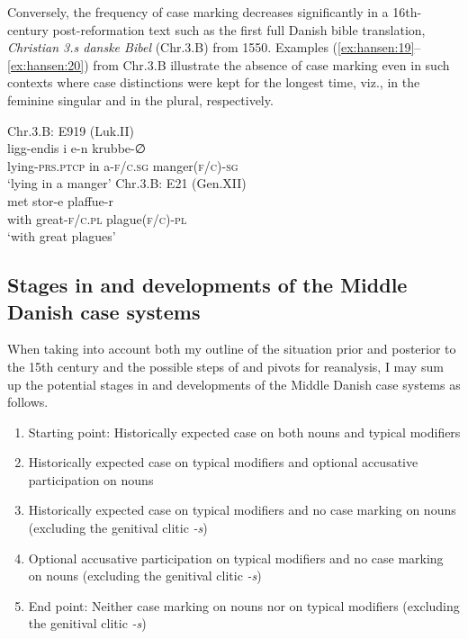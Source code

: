 \documentclass[output=paper]{langsci/langscibook}
\begin{document}
Conversely, the frequency of case marking decreases significantly in a 16th-century post-reformation text such as the first full Danish bible translation, \textit{Christian 3.s danske Bibel} (Chr.3.B) from 1550. Examples (\ref{ex:hansen:19}--\ref{ex:hansen:20}) from Chr.3.B illustrate the absence of case marking even in such contexts where case distinctions were kept for the longest time, viz., in the feminine singular and in the plural, respectively.

\ea\label{ex:hansen:19}
{Chr.3.B: E919 (Luk.II)} \\
\gll ligg-endis i e-n krubbe-∅\\
     lying-\textsc{prs.ptcp} in a\textsc{{}-f/c.sg} manger\textsc{(f/c)-sg}\\
\glt ‘lying in a manger’
\ex \label{ex:hansen:20}
{Chr.3.B: E21 (Gen.XII)} \\
\gll met stor-e plaffue-r\\
     with great-\textsc{f/c.pl} plague\textsc{(f/c)-pl}\\
\glt ‘with great plagues’
\z

\subsection{Stages in and developments of the Middle Danish case systems} \label{hansen:2.6}

When taking into account both my outline of the situation prior and posterior to the 15th century and the possible steps of and pivots for reanalysis, I may sum up the potential stages in and developments of the Middle Danish case systems as follows.

\begin{enumerate}
\item  Starting point: Historically expected case on both nouns and typical modifiers
\item  Historically expected case on typical modifiers and optional accusative participation on nouns
\item  Historically expected case on typical modifiers and no case marking on nouns (excluding the genitival clitic \textit{{}-s})
\item  Optional accusative participation on typical modifiers and no case marking on nouns (excluding the genitival clitic \textit{{}-s})
\item  End point: Neither case marking on nouns nor on typical modifiers (excluding the genitival clitic \textit{{}-s})
\end{enumerate}
\end{document}
